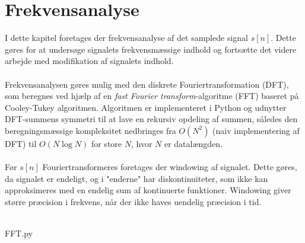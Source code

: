 \chapter{Frekvensanalyse}
I dette kapitel foretages der frekvensanalyse af det samplede signal $s[n]$. Dette gøres for at undersøge signalets frekvensmæssige indhold og fortsætte det videre arbejde med modifikation af signalets indhold.\\\\
Frekvensanalysen gøres mulig med den diskrete Fouriertransformation (DFT), som beregnes ved hjælp af en \textit{fast Fourier transform}-algoritme (FFT) baseret på Cooley-Tukey algoritmen. Algoritmen er implementeret i Python og udnytter DFT-summens symmetri til at lave en rekursiv opdeling af summen, således den beregningsmæssige kompleksitet nedbringes fra $O(N^2)$ (naiv implementering af DFT) til $O(N\log N)$ for store $N$, hvor $N$ er datalængden.\\\\
Før $s[n]$ Fouriertransformeres foretages der windowing af signalet. Dette gøres, da signalet er endeligt, og i "enderne" har diskontinuiteter, som ikke kan approksimeres med en endelig sum af kontinuerte funktioner. Windowing giver større præcision i frekvens, når der ikke haves uendelig præcision i tid.\\\\
\begin{lstinputlisting}{FFT.py}
\end{lstinputlisting}